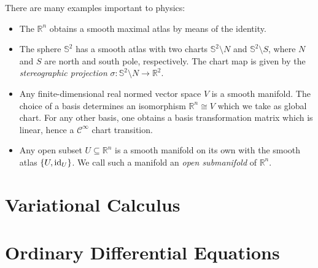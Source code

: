 There are many examples important to physics:
\begin{eg}
    \begin{itemize}
        \item The $\mathbb{R}^n$ obtains a smooth maximal atlas by means of the identity.
        \item The sphere $\mathbb{S}^2$ has a smooth atlas with two charts $\mathbb{S}^2 \setminus N$ and $\mathbb{S}^2 \setminus S$, where $N$ and $S$ are north and south pole, respectively. The chart map is given by the \emph{stereographic projection} $\sigma: \mathbb{S}^2 \setminus N \to \mathbb{R}^2$. 
        \item Any finite-dimensional real normed vector space $V$ is a smooth manifold. The choice of a basis determines an isomorphism $\mathbb{R}^n \cong V$ which we take as global chart. For any other basis, one obtains a basis transformation matrix which is linear, hence a $\mathcal{C}^\infty$ chart transition.
        \item Any open subset $U \subseteq \mathbb{R}^n$ is a smooth manifold on its own with the smooth atlas $\{U, \operatorname{id}_U\}$. We call such a manifold an \emph{open submanifold} of $\mathbb{R}^n$.
    \end{itemize}
\end{eg}
\section{Variational Calculus}

\section{Ordinary Differential Equations}
